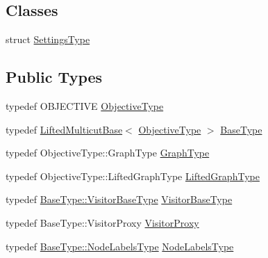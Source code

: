\subsection*{Classes}
\begin{DoxyCompactItemize}
\item 
struct \hyperlink{structnifty_1_1graph_1_1optimization_1_1lifted__multicut_1_1LiftedMulticutAndresKernighanLin_1_1SettingsType}{Settings\+Type}
\end{DoxyCompactItemize}
\subsection*{Public Types}
\begin{DoxyCompactItemize}
\item 
typedef O\+B\+J\+E\+C\+T\+I\+V\+E \hyperlink{classnifty_1_1graph_1_1optimization_1_1lifted__multicut_1_1LiftedMulticutAndresKernighanLin_a658bf9081f6bab3e55d4707d1ca57780}{Objective\+Type}
\item 
typedef \hyperlink{classnifty_1_1graph_1_1optimization_1_1lifted__multicut_1_1LiftedMulticutBase}{Lifted\+Multicut\+Base}$<$ \hyperlink{classnifty_1_1graph_1_1optimization_1_1lifted__multicut_1_1LiftedMulticutAndresKernighanLin_a658bf9081f6bab3e55d4707d1ca57780}{Objective\+Type} $>$ \hyperlink{classnifty_1_1graph_1_1optimization_1_1lifted__multicut_1_1LiftedMulticutAndresKernighanLin_a88487fe74c8a1bcd02465f18002b92a2}{Base\+Type}
\item 
typedef Objective\+Type\+::\+Graph\+Type \hyperlink{classnifty_1_1graph_1_1optimization_1_1lifted__multicut_1_1LiftedMulticutAndresKernighanLin_aa556b1d832a4ee0f4efea6dfa71e9efd}{Graph\+Type}
\item 
typedef Objective\+Type\+::\+Lifted\+Graph\+Type \hyperlink{classnifty_1_1graph_1_1optimization_1_1lifted__multicut_1_1LiftedMulticutAndresKernighanLin_ac1cabfe99b97ed316b0de5a11fe67bd1}{Lifted\+Graph\+Type}
\item 
typedef \hyperlink{classnifty_1_1graph_1_1optimization_1_1common_1_1SolverBase_a5a14d64c70a9cc0eebc7d71d2b089f9b}{Base\+Type\+::\+Visitor\+Base\+Type} \hyperlink{classnifty_1_1graph_1_1optimization_1_1lifted__multicut_1_1LiftedMulticutAndresKernighanLin_a36384cde373a8f776b897b4cb83607bb}{Visitor\+Base\+Type}
\item 
typedef Base\+Type\+::\+Visitor\+Proxy \hyperlink{classnifty_1_1graph_1_1optimization_1_1lifted__multicut_1_1LiftedMulticutAndresKernighanLin_a95be4fc2d2b7c812c300c7e42eb35f29}{Visitor\+Proxy}
\item 
typedef \hyperlink{classnifty_1_1graph_1_1optimization_1_1common_1_1SolverBase_a6e4e465f3b6e039882669fcfb9714818}{Base\+Type\+::\+Node\+Labels\+Type} \hyperlink{classnifty_1_1graph_1_1optimization_1_1lifted__multicut_1_1LiftedMulticutAndresKernighanLin_abbdc595bbaa188efccf76ea1e905507d}{Node\+Labels\+Type}
\end{DoxyCompactItemize}
